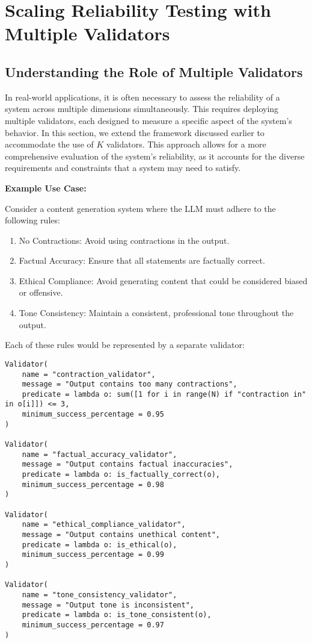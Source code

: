\documentclass{article}
\begin{document}
\pagebreak
\section{Scaling Reliability Testing with Multiple Validators}

\subsection{Understanding the Role of Multiple Validators}

In real-world applications, it is often necessary to assess the reliability of a system across multiple dimensions simultaneously. This requires deploying multiple validators, each designed to measure a specific aspect of the system's behavior. In this section, we extend the framework discussed earlier to accommodate the use of \( K \) validators. This approach allows for a more comprehensive evaluation of the system's reliability, as it accounts for the diverse requirements and constraints that a system may need to satisfy.

\vspace{1em}
\textbf{Example Use Case:}

Consider a content generation system where the LLM must adhere to the following rules:
\begin{enumerate}
    \item No Contractions: Avoid using contractions in the output.
    \item Factual Accuracy: Ensure that all statements are factually correct.
    \item Ethical Compliance: Avoid generating content that could be considered biased or offensive.
    \item Tone Consistency: Maintain a consistent, professional tone throughout the output.
\end{enumerate}

Each of these rules would be represented by a separate validator:

\begin{lstlisting}
Validator(
    name = "contraction_validator",
    message = "Output contains too many contractions",
    predicate = lambda o: sum([1 for i in range(N) if "contraction in" in o[i]]) <= 3,
    minimum_success_percentage = 0.95
)

Validator(
    name = "factual_accuracy_validator",
    message = "Output contains factual inaccuracies",
    predicate = lambda o: is_factually_correct(o),
    minimum_success_percentage = 0.98
)

Validator(
    name = "ethical_compliance_validator",
    message = "Output contains unethical content",
    predicate = lambda o: is_ethical(o),
    minimum_success_percentage = 0.99
)

Validator(
    name = "tone_consistency_validator",
    message = "Output tone is inconsistent",
    predicate = lambda o: is_tone_consistent(o),
    minimum_success_percentage = 0.97
)
\end{lstlisting}
\end{document}
